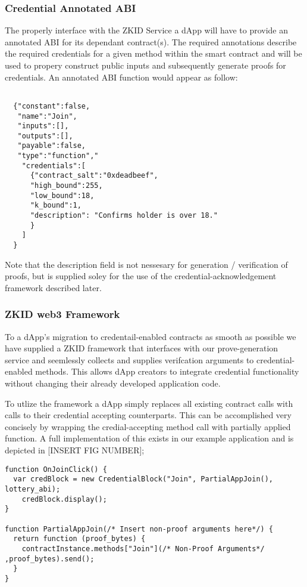 \documentclass[11 pt]{extarticle}
\theoremstyle{remark}
\begin{document}
\subsubsection{Credential Annotated ABI}
The properly interface with the ZKID Service a dApp will have to provide an annotated ABI for its dependant contract(s).
The required annotations describe the required credentials for a given method within the smart contract and will
be used to propery construct public inputs and subsequently generate proofs for credentials. An annotated ABI function
would appear as follow:
\begin{lstlisting}

  {"constant":false,
   "name":"Join",
   "inputs":[],
   "outputs":[],
   "payable":false,
   "type":"function","
    "credentials":[
      {"contract_salt":"0xdeadbeef",
      "high_bound":255,
      "low_bound":18,
      "k_bound":1,
      "description": "Confirms holder is over 18."
      }
    ]
  }
\end{lstlisting}

Note that the description field is not nessesary for generation / verification of proofs, but is supplied soley for
the use of the credential-acknowledgement framework described later. 

\subsubsection{ZKID web3 Framework}

To a dApp's migration to credentail-enabled contracts as smooth as possible we have supplied a ZKID framework that interfaces
with our prove-generation service and seemlessly collects and supplies verifcation arguments to credential-enabled methods. This 
allows dApp creators to integrate credential functionality without changing their already developed application code.

To utlize the framework a dApp simply replaces all existing contract calls with calls to their credential accepting counterparts. 
This can be accomplished very concisely by wrapping the credial-accepting method call with partially applied
function. A full implementation of this exists in our example application and is depicted in [INSERT FIG NUMBER];
\begin{lstlisting}
function OnJoinClick() {
  var credBlock = new CredentialBlock("Join", PartialAppJoin(), lottery_abi);
    credBlock.display();
}

function PartialAppJoin(/* Insert non-proof arguments here*/) {
  return function (proof_bytes) {
    contractInstance.methods["Join"](/* Non-Proof Arguments*/ ,proof_bytes).send();
  }
}

\end{lstlisting}
\end{document}
